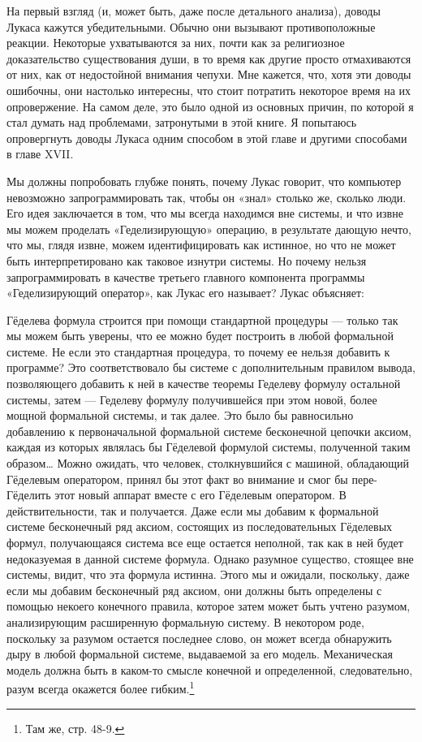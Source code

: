 \documentclass[../main.tex]{subfiles}
\begin{document}
На первый взгляд (и, может быть, даже после детального анализа), доводы Лукаса кажутся убедительными. Обычно они вызывают противоположные реакции. Некоторые ухватываются за них, почти как за религиозное доказательство существования души, в то время как другие просто отмахиваются от них, как от недостойной внимания чепухи. Мне кажется, что, хотя эти доводы ошибочны, они настолько интересны, что стоит потратить некоторое время на их опровержение. На самом деле, это было одной из основных причин, по которой я стал думать над проблемами, затронутыми в этой книге. Я попытаюсь опровергнуть доводы Лукаса одним способом в этой главе и другими способами в главе XVII.

Мы должны попробовать глубже понять, почему Лукас говорит, что компьютер невозможно запрограммировать так, чтобы он «знал» столько же, сколько люди. Его идея заключается в том, что мы всегда находимся вне системы, и что извне мы можем проделать «Геделизирующую» операцию, в результате дающую нечто, что мы, глядя извне, можем идентифицировать как истинное, но что не может быть интерпретировано как таковое изнутри системы. Но почему нельзя запрограммировать в качестве третьего главного компонента программы «Геделизирующий оператор», как Лукас его называет? Лукас объясняет:

Гёделева формула строится при помощи стандартной процедуры --- только так мы можем быть уверены, что ее можно будет построить в любой формальной системе. Не если это стандартная процедура, то почему ее нельзя добавить к программе? Это соответствовало бы системе с дополнительным правилом вывода, позволяющего добавить к ней в качестве теоремы Геделеву формулу остальной системы, затем --- Геделеву формулу получившейся при этом новой, более мощной формальной системы, и так далее. Это было бы равносильно добавлению к первоначальной формальной системе бесконечной цепочки аксиом, каждая из которых являлась бы Гёделевой формулой системы, полученной таким образом\ldots{} Можно ожидать, что человек, столкнувшийся с машиной, обладающий Гёделевым оператором, принял бы этот факт во внимание и смог бы пере-Гёделить этот новый аппарат вместе с его Гёделевым оператором. В действительности, так и получается. Даже если мы добавим к формальной системе бесконечный ряд аксиом, состоящих из последовательных Гёделевых формул, получающаяся система все еще остается неполной, так как в ней будет недоказуемая в данной системе формула. Однако разумное существо, стоящее вне системы, видит, что эта формула истинна. Этого мы и ожидали, поскольку, даже если мы добавим бесконечный ряд аксиом, они должны быть определены с помощью некоего конечного правила, которое затем может быть учтено разумом, анализирующим расширенную формальную систему. В некотором роде, поскольку за разумом остается последнее слово, он может всегда обнаружить дыру в любой формальной системе, выдаваемой за его модель. Механическая модель должна быть в каком-то смысле конечной и определенной, следовательно, разум всегда окажется более гибким.\footnote{Там же, стр. 48-9.}
\end{document}
